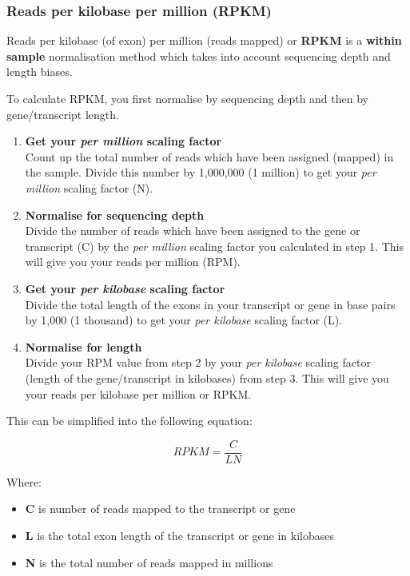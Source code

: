 \documentclass[11pt]{article}
\providecommand{\tightlist}{%
      \setlength{\itemsep}{0pt}\setlength{\parskip}{0pt}}
\begin{document}
    \hypertarget{reads-per-kilobase-per-million-rpkm}{%
\subsubsection{Reads per kilobase per million
(RPKM)}\label{reads-per-kilobase-per-million-rpkm}}

Reads per kilobase (of exon) per million (reads mapped) or \textbf{RPKM}
is a \textbf{within sample} normalisation method which takes into
account sequencing depth and length biases.

To calculate RPKM, you first normalise by sequencing depth and then by
gene/transcript length.

\begin{enumerate}
\def\labelenumi{\arabic{enumi}.}
\item
  \textbf{Get your \textit{per million} scaling factor}\\
  Count up the total number of reads which have been assigned (mapped)
  in the sample. Divide this number by 1,000,000 (1 million) to get your
  \textit{per million} scaling factor (N).
\item
  \textbf{Normalise for sequencing depth}\\
  Divide the number of reads which have been assigned to the gene or
  transcript (C) by the \textit{per million} scaling factor you calculated
  in step 1. This will give you your reads per million (RPM).
\item
  \textbf{Get your \textit{per kilobase} scaling factor}\\
  Divide the total length of the exons in your transcript or gene in
  base pairs by 1,000 (1 thousand) to get your \textit{per kilobase}
  scaling factor (L).
\item
  \textbf{Normalise for length}\\
  Divide your RPM value from step 2 by your \textit{per kilobase} scaling
  factor (length of the gene/transcript in kilobases) from step 3. This
  will give you your reads per kilobase per million or RPKM.
\end{enumerate}

This can be simplified into the following equation:

\begin{equation*}
RPKM = \frac {C}{LN}
\end{equation*}

\newpage

Where:

\begin{itemize}
\tightlist
\item
  \textbf{C} is number of reads mapped to the transcript or gene
\item
  \textbf{L} is the total exon length of the transcript or gene in
  kilobases
\item
  \textbf{N} is the total number of reads mapped in millions
\end{itemize}
\end{document}
